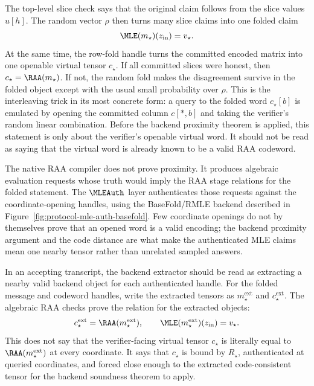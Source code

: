 The top-level slice check says that the original claim follows from the slice
values \(u[h]\).  The random vector \(\rho\) then turns many slice claims into
one folded claim
\[
  \MLE(m_\star)(z_{\mathrm{in}})=v_\star.
\]
At the same time, the row-fold handle turns the committed encoded matrix into
one openable virtual tensor \(c_\star\).  If all committed slices were honest,
then \(c_\star=\RAA(m_\star)\).  If not, the random fold makes the disagreement
survive in the folded object except with the usual small probability over
\(\rho\).  This is the interleaving trick in its most concrete form: a query to
the folded word \(c_\star[b]\) is emulated by opening the committed column
\(c[\ast,b]\) and taking the verifier's random linear combination.
Before the backend proximity theorem is applied, this statement is only about
the verifier's openable virtual word.  It should not be read as saying that the
virtual word is already known to be a valid RAA codeword.

The native RAA compiler does not prove proximity.  It produces algebraic
evaluation requests whose truth would imply the RAA stage relations for the
folded statement.  The \(\MLEAuth\) layer authenticates those requests against
the coordinate-opening handles, using the BaseFold/RMLE backend described in
Figure~\ref{fig:protocol-mle-auth-basefold}.  Few coordinate openings do not by
themselves prove that an opened word is a valid encoding; the backend proximity
argument and the code distance are what make the authenticated MLE claims mean
one nearby tensor rather than unrelated sampled answers.

In an accepting transcript, the backend extractor should be read as extracting
a nearby valid backend object for each authenticated handle.  For the folded
message and codeword handles, write the extracted tensors as
\(m_\star^{\mathrm{ext}}\) and \(c_\star^{\mathrm{ext}}\).  The algebraic RAA
checks prove the relation for the extracted objects:
\[
  c_\star^{\mathrm{ext}}=\RAA(m_\star^{\mathrm{ext}}),
  \qquad
  \MLE(m_\star^{\mathrm{ext}})(z_{\mathrm{in}})=v_\star.
\]
This does not say that the verifier-facing virtual tensor \(c_\star\) is
literally equal to \(\RAA(m_\star^{\mathrm{ext}})\) at every coordinate.  It says that
\(c_\star\) is bound by \(R_\star\), authenticated at queried coordinates, and
forced close enough to the extracted code-consistent tensor for the backend
soundness theorem to apply.

